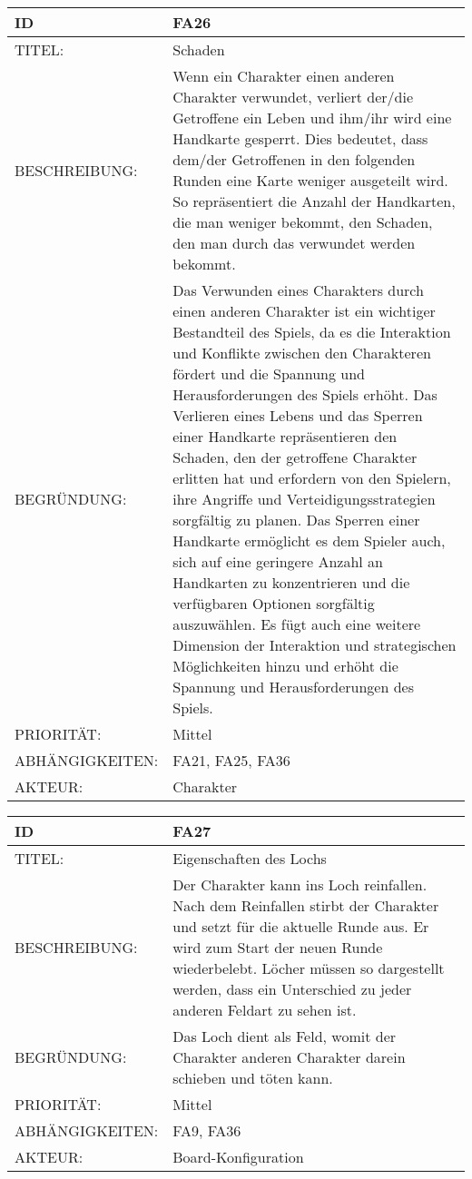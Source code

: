 \documentclass{uulm-assignment}
\begin{document}
    \begin{tabularx}{\textwidth}{|l|X |} \hline
        \textbf{ID} & \textbf{FA26} \\
        \hline
        TITEL: & Schaden \\
        \hline
        BESCHREIBUNG: & Wenn ein Charakter einen anderen Charakter verwundet, verliert der/die Getroffene ein Leben und ihm/ihr
wird eine Handkarte gesperrt. Dies bedeutet, dass dem/der Getroffenen in den folgenden Runden
eine Karte weniger ausgeteilt wird. So repräsentiert die Anzahl der Handkarten, die man weniger
bekommt, den Schaden, den man durch das verwundet werden bekommt.
        \\
        \hline
        BEGRÜNDUNG: & Das Verwunden eines Charakters durch einen anderen Charakter ist ein wichtiger Bestandteil des Spiels, da es die Interaktion und Konflikte zwischen den Charakteren fördert und die Spannung und Herausforderungen des Spiels erhöht. Das Verlieren eines Lebens und das Sperren einer Handkarte repräsentieren den Schaden, den der getroffene Charakter erlitten hat und erfordern von den Spielern, ihre Angriffe und Verteidigungsstrategien sorgfältig zu planen.
Das Sperren einer Handkarte ermöglicht es dem Spieler auch, sich auf eine geringere Anzahl an Handkarten zu konzentrieren und die verfügbaren Optionen sorgfältig auszuwählen.
Es fügt auch eine weitere Dimension der Interaktion und strategischen Möglichkeiten hinzu und erhöht die Spannung und Herausforderungen des Spiels. \\
        \hline
        PRIORITÄT: & Mittel\\
        \hline
        ABHÄNGIGKEITEN: & FA21, FA25, FA36 \\
        \hline
        AKTEUR: & Charakter\\
        \hline
    \end{tabularx}
    
    \begin{tabularx}{\textwidth}{|l|X |} \hline
        \textbf{ID} & \textbf{FA27} \\
        \hline
        TITEL: &  Eigenschaften des Lochs\\
        \hline
        BESCHREIBUNG: & Der Charakter kann ins Loch reinfallen. Nach dem Reinfallen stirbt der Charakter und setzt für die aktuelle
Runde aus. Er wird zum Start der neuen Runde wiederbelebt. Löcher müssen so dargestellt werden,
dass ein Unterschied zu jeder anderen Feldart zu sehen ist.
        \\
        \hline
        BEGRÜNDUNG: & Das Loch dient als Feld, womit der Charakter anderen Charakter darein schieben und töten kann. \\
        \hline
        PRIORITÄT: & Mittel\\
        \hline
        ABHÄNGIGKEITEN: & FA9, FA36 \\
        \hline
        AKTEUR: & Board-Konfiguration\\
        \hline
    \end{tabularx}
    
\end{document}
